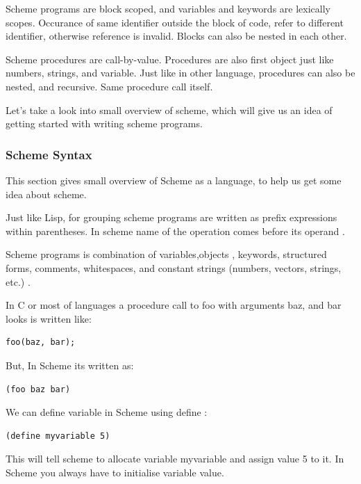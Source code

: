 Scheme programs are block scoped, and variables and keywords are lexically scopes. Occurance of same identifier outside the block of code, refer to different identifier, otherwise reference is invalid. Blocks can also be nested in each other.

Scheme procedures are call-by-value. Procedures are also first object just like numbers, strings, and variable. Just like in other language, procedures can also be nested, and recursive. Same procedure call itself. 

Let's take a look into small overview of scheme, which will give us an idea of getting started with writing scheme programs.

\subsubsection{Scheme Syntax}

This section gives small overview of Scheme as a language, to help us get some idea about scheme.

Just like Lisp, for grouping scheme programs are written as prefix expressions within parentheses. In scheme name of the operation comes before its operand \cite{Krishnamurthi:1994:IS:197149.197166}.

Scheme programs is combination of variables,objects , keywords, structured forms, comments, whitespaces, and constant strings (numbers, vectors, strings, etc.)  \cite{SchemeLanguage}.



In C or most of languages a procedure call to foo with arguments baz, and bar looks is written like: 

\begin{lstlisting}[frame=single]  
foo(baz, bar);
\end{lstlisting}

But, In Scheme its written as: 

\begin{lstlisting}[frame=single]  
(foo baz bar)
\end{lstlisting}

We can define variable in Scheme using define :

\begin{lstlisting}[frame=single]  
(define myvariable 5)
\end{lstlisting}

This will tell scheme to allocate variable myvariable and assign value 5 to it. In Scheme you always have to initialise variable value. 


